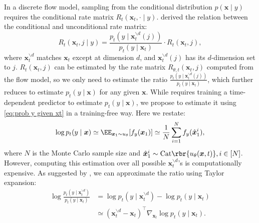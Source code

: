 In a discrete flow model, sampling from the conditional distribution $p(\boldsymbol{x} \mid y)$ requires the conditional rate matrix $R_t(\boldsymbol{x}_t, \cdot \mid y)$. \cite{nisonoff2024unlocking} derived the relation between the conditional and unconditional rate matrix:
\begin{equation}
    R_t(\boldsymbol{x}_t, j \mid y) = \frac{p_t(y \mid \boldsymbol{x}_t^{\backslash d}(j) )}{p_t(y \mid \boldsymbol{x}_t)} \cdot R_t(\boldsymbol{x}_t, j),
\end{equation}
where $\boldsymbol{x}_t^{\backslash d}$ matches $\boldsymbol{x}_t$  except at dimension $d$, and  $\boldsymbol{x}_t^{\backslash d}(j)$ has its $d$-dimension set to $j$. $R_t(\boldsymbol{x}_t, j)$ can be estimated by the rate matrix $R_{\theta, t}(\boldsymbol{x}_t, j)$ computed from the flow model, so we only need to estimate the ratio $\frac{p_t(y \mid \boldsymbol{x}_t^{\backslash d}(j) )}{p_t(y \mid \boldsymbol{x}_t)}$, which further reduces to estimate $p_t(y \mid \boldsymbol{x})$ for any given $\boldsymbol{x}$. While \citet{nisonoff2024unlocking} requires training a time-dependent predictor to estimate $p_t(y \mid \boldsymbol{x})$, we propose to estimate it using \eqref{eq:prob y given xt} in a training-free way. Here we restate:
\begin{equation}\label{eq:training-free estimate for discrete}
       \log p_t(y \mid \boldsymbol{x}) \simeq \EE_{\boldsymbol{x}_1 \sim u_\theta } [f_y(\boldsymbol{x}_1)] \simeq \frac{1}{N}\sum_{i=1}^N f_y({\hat{\boldsymbol{x}}_1^{i}}),
\end{equation}
where $N$ is  the Monte Carlo sample size and $\hat{\boldsymbol{x}}_1^i \sim \text{Cat} \rbr{u_\theta( \boldsymbol{x}, t)}, i \in [N]$. However, computing this estimation over all possible $ \boldsymbol{x}_t^{\backslash d}$'s is computationally expensive. As suggested by \citet{nisonoff2024unlocking, vignac2022digress}, we can approximate the ratio using Taylor expansion:
\begin{equation}
\begin{aligned}
    \log \frac{p_t(y \mid \boldsymbol{x}_t^{\backslash d} )}{p_t(y \mid \boldsymbol{x}_t)} &= {\log p_t(y \mid \boldsymbol{x}_t^{\backslash d} )}-{\log p_t(y \mid \boldsymbol{x}_t)} \\
    & \simeq (\boldsymbol{x}_t^{\backslash
       d} - \boldsymbol{x}_t)^{\top} \nabla_{\boldsymbol{x}_t} \log p_t(y\mid \boldsymbol{x}_t).
    \label{eq: taylor expansion}
\end{aligned}
\end{equation}
